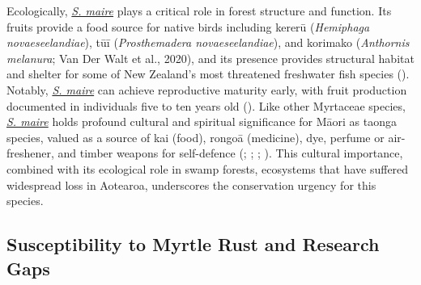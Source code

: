 \documentclass[
]{scrreprt}
\begin{document}
Ecologically, \hyperref[acronyms_SM]{\emph{S. maire}} plays a critical
role in forest structure and function. Its fruits provide a food source
for native birds including kererū (\emph{Hemiphaga novaeseelandiae}),
tūī (\emph{Prosthemadera novaeseelandiae}), and korimako
(\emph{Anthornis melanura}; Van Der Walt et al., 2020), and its presence
provides structural habitat and shelter for some of New Zealand's most
threatened freshwater fish species (). Notably, \hyperref[acronyms_SM]{\emph{S. maire}} can
achieve reproductive maturity early, with fruit production documented in
individuals five to ten years old
().
Like other Myrtaceae species, \hyperref[acronyms_SM]{\emph{S. maire}}
holds profound cultural and spiritual significance for Māori as taonga
species, valued as a source of kai (food), rongoā (medicine), dye,
perfume or air-freshener, and timber weapons for self-defence
(;
;
;
). This cultural importance, combined with its ecological
role in swamp forests, ecosystems that have suffered widespread loss in
Aotearoa, underscores the conservation urgency for this species.

\subsection{Susceptibility to Myrtle Rust and Research
Gaps}\label{susceptibility-to-myrtle-rust-and-research-gaps}
\end{document}
